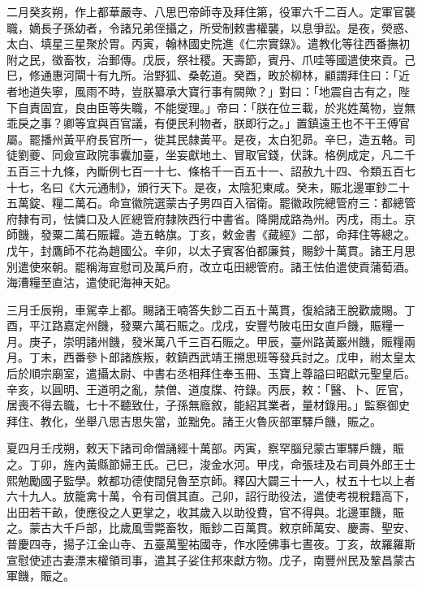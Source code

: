 \begin{pinyinscope}
 二月癸亥朔，作上都華嚴寺、八思巴帝師寺及拜住第，役軍六千二百人。定軍官襲職，嫡長子孫幼者，令諸兄弟侄攝之，所受制敕書權襲，以息爭訟。是夜，熒惑、太白、填星三星聚於胃。丙寅，翰林國史院進《仁宗實錄》。遣教化等往西番撫初附之民，徵畜牧，治郵傳。戊辰，祭社稷。天壽節，賓丹、爪哇等國遣使來貢。己巳，修通惠河閘十有九所。治野狐、桑乾道。癸酉，畋於柳林，顧謂拜住曰：「近者地道失寧，風雨不時，豈朕纂承大寶行事有闕歟？」對曰：「地震自古有之，陛下自責固宜，良由臣等失職，不能燮理。」帝曰：「朕在位三載，於兆姓萬物，豈無乖戾之事？卿等宜與百官議，有便民利物者，朕即行之。」置鎮遠王也不干王傅官屬。罷播州黃平府長官所一，徙其民隸黃平。是夜，太白犯昴。辛巳，造五輅。司徒劉夔、同僉宣政院事囊加臺，坐妄獻地土、冒取官錢，伏誅。格例成定，凡二千五百三十九條，內斷例七百一十七、條格千一百五十一、詔赦九十四、令類五百七十七，名曰《大元通制》，頒行天下。是夜，太陰犯東咸。癸未，賑北邊軍鈔二十五萬錠、糧二萬石。命宣徽院選蒙古子男四百入宿衛。罷徽政院總管府三：都總管府隸有司，怯憐口及人匠總管府隸陜西行中書省。降開成路為州。丙戌，雨土。京師饑，發粟二萬石賑糶。造五輅旗。丁亥，敕金書《藏經》二部，命拜住等總之。戊午，封鷹師不花為趙國公。辛卯，以太子賓客伯都廉貧，賜鈔十萬貫。諸王月思別遣使來朝。罷稱海宣慰司及萬戶府，改立屯田總管府。諸王怯伯遣使貢蒲萄酒。海漕糧至直沽，遣使祀海神天妃。



 三月壬辰朔，車駕幸上都。賜諸王喃答失鈔二百五十萬貫，復給諸王脫歡歲賜。丁酉，平江路嘉定州饑，發粟六萬石賑之。戊戌，安豐芍陂屯田女直戶饑，賑糧一月。庚子，崇明諸州饑，發米萬八千三百石賑之。甲辰，臺州路黃巖州饑，賑糧兩月。丁未，西番參卜郎諸族叛，敕鎮西武靖王搠思班等發兵討之。戊申，祔太皇太后於順宗廟室，遣攝太尉、中書右丞相拜住奉玉冊、玉寶上尊謚曰昭獻元聖皇后。辛亥，以圓明、王道明之亂，禁僧、道度牒、符錄。丙辰，敕：「醫、卜、匠官，居喪不得去職，七十不聽致仕，子孫無廕敘，能紹其業者，量材錄用。」監察御史拜住、教化，坐舉八思吉思失當，並黜免。諸王火魯灰部軍驛戶饑，賑之。



 夏四月壬戌朔，敕天下諸司命僧誦經十萬部。丙寅，察罕腦兒蒙古軍驛戶饑，賑之。丁卯，旌內黃縣節婦王氏。己巳，浚金水河。甲戌，命張珪及右司員外郎王士熙勉勵國子監學。敕都功德使闊兒魯至京師。釋囚大闢三十一人，杖五十七以上者六十九人。放籠禽十萬，令有司償其直。己卯，詔行助役法，遣使考視稅籍高下，出田若干畝，使應役之人更掌之，收其歲入以助役費，官不得與。北邊軍饑，賑之。蒙古大千戶部，比歲風雪斃畜牧，賑鈔二百萬貫。敕京師萬安、慶壽、聖安、普慶四寺，揚子江金山寺、五臺萬聖祐國寺，作水陸佛事七晝夜。丁亥，故羅羅斯宣慰使述古妻漂末權領司事，遣其子娑住邦來獻方物。戊子，南豐州民及鞏昌蒙古軍饑，賑之。




\end{pinyinscope}
